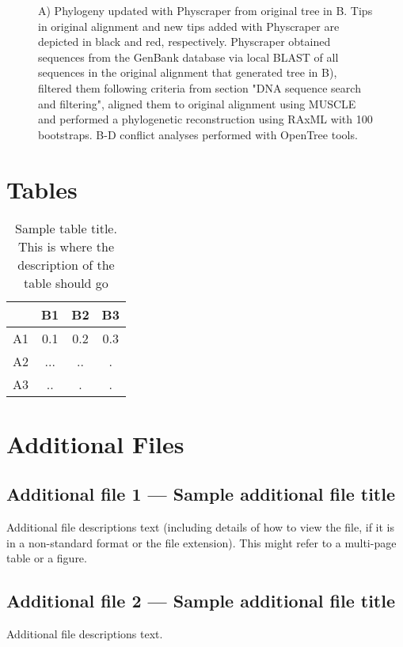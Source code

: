 \documentclass{bmcart}
\begin{document}
\begin{backmatter}
\begin{figure}[h!]
  \caption{A) Phylogeny updated with Physcraper from original
  \cite{gottlieb2005molecular} tree in B.
  Tips in original alignment and new tips added with Physcraper are depicted in
  black and red, respectively. Physcraper obtained sequences from the GenBank
  database via local BLAST of all sequences in the original alignment that generated
  tree in B), filtered them following criteria from section "DNA sequence search and
  filtering", aligned them to original alignment using MUSCLE and performed a
  phylogenetic reconstruction using RAxML with 100 bootstraps. B-D conflict analyses
  performed with OpenTree tools.}
\end{figure}


\section*{Tables}
\begin{table}[h!]
\caption{Sample table title. This is where the description of the table should go}
  \begin{tabular}{cccc}
    \hline
    & B1  &B2   & B3\\ \hline
    A1 & 0.1 & 0.2 & 0.3\\
    A2 & ... & ..  & .\\
    A3 & ..  & .   & .\\ \hline
  \end{tabular}
\end{table}


\section*{Additional Files}
  \subsection*{Additional file 1 --- Sample additional file title}
    Additional file descriptions text (including details of how to
    view the file, if it is in a non-standard format or the file extension).  This might
    refer to a multi-page table or a figure.

  \subsection*{Additional file 2 --- Sample additional file title}
    Additional file descriptions text.

\end{backmatter}
\end{document}
